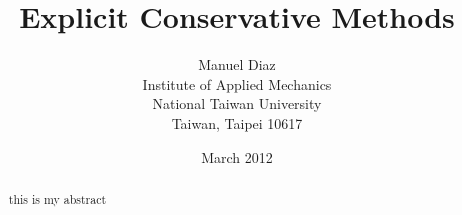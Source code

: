 \documentclass[a4paper]{article}
\begin{document}
\title{Explicit Conservative Methods}
\author{Manuel Diaz\\[1ex]
	Institute of Applied Mechanics\\
	National Taiwan University \\
	Taiwan, Taipei 10617
	}
\date{March 2012}
\maketitle

\tableofcontents

\begin{abstract}
this is my abstract
\end{abstract}










\end{document}
